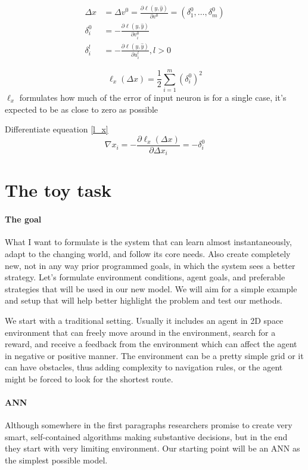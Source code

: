 \documentclass{article}
\begin{document}
\begin{align}
\Delta x &= \Delta v^0 = \frac{\partial \ell(y,\hat y)}{\partial v^0} = \left(\delta_1^0,\dots,\delta_m^0 \right) \\
\delta_i^0 &= - \frac{\partial \ell(y, \hat y)}{\partial v_i^0} \\
\delta_i^l &= - \frac{\partial \ell(y, \hat y)}{\partial u_i^l}, l>0
\end{align}

\begin{equation}\label{l_x}
\ell_x(\Delta x) = \frac{1}{2} \sum_{i=1}^{m}(\delta_i^0)^2
\end{equation}
$\ell_x$ formulates how much of the error of input neuron is for a single case, it's expected to be as close to zero as possible

Differentiate equeation \eqref{l_x}
\begin{equation}
\nabla x_i = -\frac{\partial \ell_x(\Delta x)}{\partial \Delta x_i} = - \delta_i^0
\end{equation}



\section{The toy task}

\paragraph{The goal}
What I want to formulate is the system that can learn almost instantaneously, adapt to the changing world, and follow its core needs. Also create completely new, not in any way prior programmed goals, in which the system sees a better strategy. Let’s formulate environment conditions, agent goals, and preferable strategies that will be used in our new model. We will aim for a simple example and setup that will help better highlight the problem and test our methods.

We start with a traditional setting. Usually it includes an agent in 2D space environment that can freely move around in the environment, search for a reward, and receive a feedback from the environment which can affect the agent in negative or positive manner. The environment can be a pretty simple grid or it can have obstacles, thus adding complexity to navigation rules, or the agent might be forced to look for the shortest route.

\paragraph{ANN}
Although somewhere in the first paragraphs researchers promise to create very smart, self-contained algorithms making substantive decisions, but in the end they start with very limiting environment. Our starting point will be an ANN as the simplest possible model.
\end{document}
